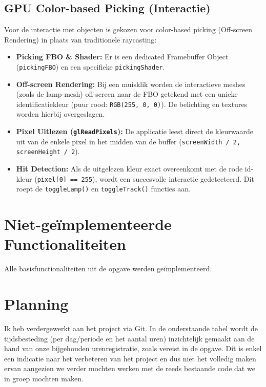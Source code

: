 \documentclass[11pt,a4paper]{article}
\begin{document}
\subsection{GPU Color-based Picking (Interactie)}
Voor de interactie met objecten is gekozen voor color-based picking (Off-screen Rendering) in plaats van traditionele raycasting:
\begin{itemize}
	\item \textbf{Picking FBO \& Shader:} Er is een dedicated Framebuffer Object (\texttt{pickingFBO}) en een specifieke \texttt{pickingShader}.
	\item \textbf{Off-screen Rendering:} Bij een muisklik worden de interactieve meshes (zoals de lamp-mesh) off-screen naar de FBO getekend met een unieke identificatiekleur (puur rood: \texttt{RGB(255, 0, 0)}). De belichting en textures worden hierbij overgeslagen.
	\item \textbf{Pixel Uitlezen (\texttt{glReadPixels}):} De applicatie leest direct de kleurwaarde uit van de enkele pixel in het midden van de buffer (\texttt{screenWidth / 2, screenHeight / 2}).
	\item \textbf{Hit Detection:} Als de uitgelezen kleur exact overeenkomt met de rode id-kleur (\texttt{pixel[0] == 255}), wordt een succesvolle interactie gedetecteerd. Dit roept de \texttt{toggleLamp()} en \texttt{toggleTrack()} functies aan.
\end{itemize}

\section{Niet-geïmplementeerde Functionaliteiten}
Alle basisfunctionaliteiten uit de opgave werden geïmplementeerd.

\section{Planning}
Ik heb verdergewerkt aan het project via Git. In de onderstaande tabel wordt de tijdsbesteding (per dag/periode en het aantal uren) inzichtelijk gemaakt aan de hand van onze bijgehouden urenregistratie, zoals vereist in de opgave. Dit is enkel een indicatie naar het verbeteren van het project en dus niet het volledig maken ervan aangezien we verder mochten werken met de reeds bestaande code dat we in groep mochten maken.
\end{document}
